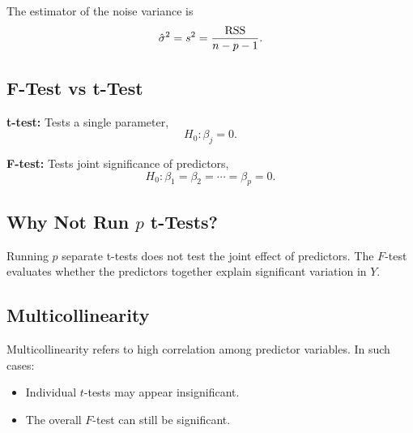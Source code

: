 The estimator of the noise variance is
\[
\hat{\sigma}^2 = s^2 = \frac{\mathrm{RSS}}{n-p-1}.
\]

\subsection{F-Test vs t-Test}

\textbf{t-test:} Tests a single parameter,
\[
H_0 : \beta_j = 0.
\]

\textbf{F-test:} Tests joint significance of predictors,
\[
H_0 : \beta_1 = \beta_2 = \cdots = \beta_p = 0.
\]

\subsection{Why Not Run $p$ t-Tests?}

Running $p$ separate t-tests does not test the joint effect of predictors. The $F$-test evaluates whether the predictors together explain significant variation in $Y$.

\subsection{Multicollinearity}

Multicollinearity refers to high correlation among predictor variables. In such cases:
\begin{itemize}
\item Individual $t$-tests may appear insignificant.
\item The overall $F$-test can still be significant.
\end{itemize}

\clearpage
